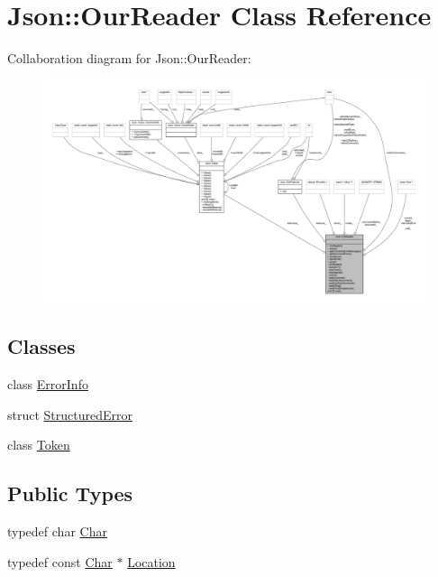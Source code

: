 \hypertarget{class_json_1_1_our_reader}{}\section{Json\+:\+:Our\+Reader Class Reference}
\label{class_json_1_1_our_reader}


Collaboration diagram for Json\+:\+:Our\+Reader\+:\nopagebreak
\begin{figure}[H]
\begin{center}
\leavevmode
\includegraphics[width=350pt]{class_json_1_1_our_reader__coll__graph}
\end{center}
\end{figure}
\subsection*{Classes}
\begin{DoxyCompactItemize}
\item 
class \hyperlink{class_json_1_1_our_reader_1_1_error_info}{Error\+Info}
\item 
struct \hyperlink{struct_json_1_1_our_reader_1_1_structured_error}{Structured\+Error}
\item 
class \hyperlink{class_json_1_1_our_reader_1_1_token}{Token}
\end{DoxyCompactItemize}
\subsection*{Public Types}
\begin{DoxyCompactItemize}
\item 
typedef char \hyperlink{class_json_1_1_our_reader_a0cd0bab4caa66594ab843ccd5f9dc239}{Char}
\item 
typedef const \hyperlink{class_json_1_1_our_reader_a0cd0bab4caa66594ab843ccd5f9dc239}{Char} $\ast$ \hyperlink{class_json_1_1_our_reader_a1bdc7bbc52ba87cae6b19746f2ee0189}{Location}
\end{DoxyCompactItemize}
